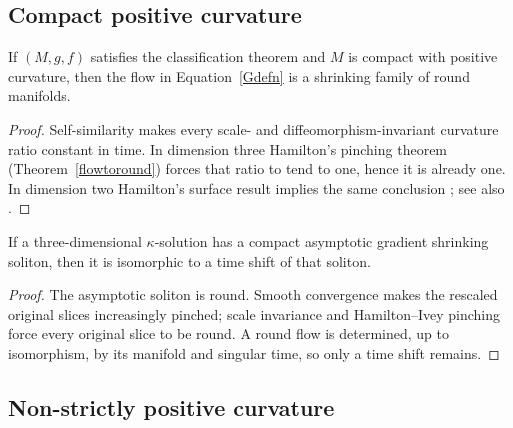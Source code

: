 \subsection{Compact positive curvature}\label{compactcs}

\begin{claim}\label{claim:compact-positive-curvature-round}

If $(M,g,f)$ satisfies the classification theorem and $M$ is
compact with positive curvature, then the flow in
Equation~\ref{Gdefn} is a shrinking family of round manifolds.
\end{claim}
\begin{proof}
\sketch Self-similarity makes every scale- and
diffeomorphism-invariant curvature ratio constant in time. In
dimension three Hamilton's pinching theorem
(Theorem~\ref{flowtoround}) forces that ratio to tend to one, hence
it is already one. In dimension two Hamilton's surface result
implies the same conclusion \cite{Hamiltonsurface}; see also
\cite{ChowKnopf}.
\end{proof}

\begin{corollary}\label{cor:compact-asymptotic-soliton-classification}
\label{compactcase}

If a three-dimensional $\kappa$-solution has a compact asymptotic
gradient shrinking soliton, then it is isomorphic to a time shift of
that soliton.
\end{corollary}
\begin{proof}
\sketch
{}
The asymptotic soliton is round. Smooth convergence makes the
rescaled original slices increasingly pinched; scale invariance and
Hamilton--Ivey pinching force every original slice to be round. A
round flow is determined, up to isomorphism, by its manifold and
singular time, so only a time shift remains.
\end{proof}

\subsection{Non-strictly positive curvature}

